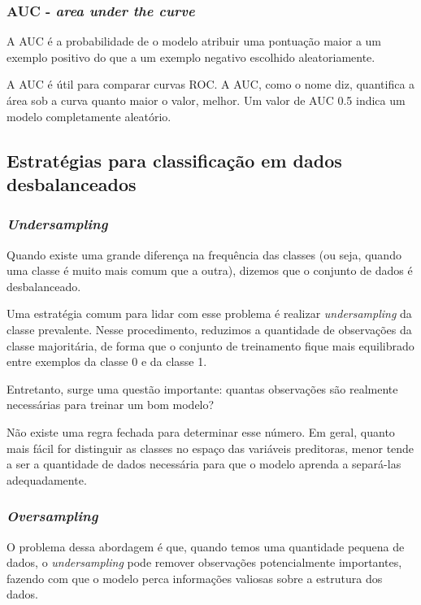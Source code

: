 \documentclass{article}
\begin{document}
\subsubsection{AUC - \textit{area under the curve}}

A AUC é a probabilidade de o modelo atribuir uma pontuação maior a um 
exemplo positivo do que a um exemplo negativo escolhido aleatoriamente. 

A AUC é útil para comparar curvas ROC. A AUC, como o nome diz, quantifica 
a área sob a curva quanto maior o valor, melhor. Um valor de AUC 0.5 indica
um modelo completamente aleatório.

\subsection{Estratégias para classificação em dados desbalanceados}

\subsubsection{\textit{Undersampling}}

Quando existe uma grande diferença na frequência das classes (ou seja, 
quando uma classe é muito mais comum que a outra), dizemos que o conjunto 
de dados é desbalanceado.

Uma estratégia comum para lidar com esse problema é realizar \textit{undersampling} 
da classe prevalente. Nesse procedimento, reduzimos a quantidade de observações da 
classe majoritária, de forma que o conjunto de treinamento fique mais equilibrado 
entre exemplos da classe 0 e da classe 1.

Entretanto, surge uma questão importante: quantas observações são realmente 
necessárias para treinar um bom modelo?

Não existe uma regra fechada para determinar esse número. Em geral, quanto mais fácil 
for distinguir as classes no espaço das variáveis preditoras, menor tende a ser a 
quantidade de dados necessária para que o modelo aprenda a separá-las adequadamente.

\subsubsection{\textit{Oversampling}}

O problema dessa abordagem é que, quando temos uma quantidade pequena de dados,
o \textit{undersampling} pode remover observações potencialmente importantes,
fazendo com que o modelo perca informações valiosas sobre a estrutura dos dados.
\end{document}
